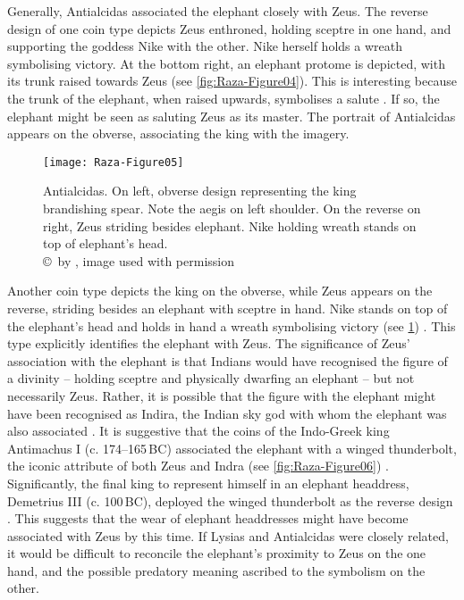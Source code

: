 \documentclass{ijsra}
\renewcommand\BC{{\,BC\xspace}}
\begin{document}
Generally, Antialcidas associated the elephant closely with Zeus. The reverse design of one coin type depicts Zeus enthroned,
holding sceptre in one hand, and supporting the goddess Nike with the other.
Nike herself holds a wreath symbolising victory.
At the bottom right, an elephant protome is depicted, with its trunk raised towards Zeus (see \cref{fig:Raza-Figure04}).
This is interesting because the trunk of the elephant, when raised upwards, symbolises a salute \parencite[33--34]{Whitehead1970}.
If so, the elephant might be seen as saluting Zeus as its master.
The portrait of Antialcidas appears on the obverse, associating the king with the imagery. 

\begin{figure}[!htb] %
	\centering
	\texttt{[image: Raza-Figure05]}
	\caption{Antialcidas. On left, obverse design representing the king brandishing spear. Note the aegis on left shoulder. On the reverse on right, Zeus striding besides elephant. Nike holding wreath stands on top of elephant’s head.
		{\normalfont\scriptsize \\ \copyright\ by \cite{Coin}, image used with permission}}
	\label{fig:Raza-Figure05}
\end{figure}

Another coin type depicts the king on the obverse, while Zeus appears on the reverse, striding besides an elephant with sceptre in hand. 
Nike stands on top of the elephant’s head and holds in hand a wreath symbolising victory (see \cref{fig:Raza-Figure05}) \parencite[27]{Narain1991}. 
This type explicitly identifies the elephant with Zeus. 
The significance of Zeus’ association with the elephant is that Indians would have recognised the figure of a divinity
– holding sceptre and physically dwarfing an elephant – but not necessarily Zeus. 
Rather, it is possible that the figure with the elephant might have been recognised as Indira,
the Indian sky god with whom the elephant was also associated \parencite[247]{MacDowall2007b}. 
It is suggestive that the coins of the Indo-Greek king Antimachus I (c. 174--165\BC) associated the elephant with a winged thunderbolt,
the iconic attribute of both Zeus and Indra (see \cref{fig:Raza-Figure06}) \parencites[242]{MacDowall2007b}[260]{Narain2003}.
Significantly, the final king to represent himself in an elephant headdress, Demetrius III (c. 100\BC),
deployed the winged thunderbolt as the reverse design \parencites[17--18]{Kalita1997}[362]{Sircar2008}.
This suggests that the wear of elephant headdresses might have become associated with Zeus by this time. 
If Lysias and Antialcidas were closely related, it would be difficult to reconcile the elephant’s proximity to Zeus on the one hand,
and the possible predatory meaning ascribed to the symbolism on the other.
\end{document}
